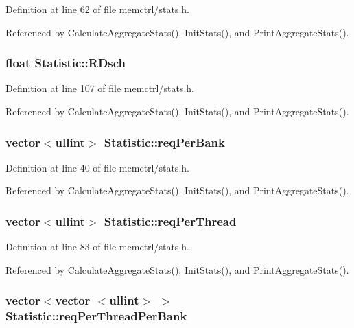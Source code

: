Definition at line 62 of file memctrl/stats.h.

Referenced by CalculateAggregateStats(), InitStats(), and PrintAggregateStats().
\subsubsection[{RDsch}]{\setlength{\rightskip}{0pt plus 5cm}float {\bf Statistic::RDsch}}\label{classStatistic_9a13d30bd7adaeb17df18ebc78536eda}




Definition at line 107 of file memctrl/stats.h.

Referenced by CalculateAggregateStats(), InitStats(), and PrintAggregateStats().
\subsubsection[{reqPerBank}]{\setlength{\rightskip}{0pt plus 5cm}vector$<${\bf ullint}$>$ {\bf Statistic::reqPerBank}}\label{classStatistic_c0e310889bcabc3c28c3947b016104c1}




Definition at line 40 of file memctrl/stats.h.

Referenced by CalculateAggregateStats(), InitStats(), and PrintAggregateStats().
\subsubsection[{reqPerThread}]{\setlength{\rightskip}{0pt plus 5cm}vector$<${\bf ullint}$>$ {\bf Statistic::reqPerThread}}\label{classStatistic_de8f6ad2747e3c7932fb23a4d658cc3e}




Definition at line 83 of file memctrl/stats.h.

Referenced by CalculateAggregateStats(), InitStats(), and PrintAggregateStats().
\subsubsection[{reqPerThreadPerBank}]{\setlength{\rightskip}{0pt plus 5cm}vector$<$vector $<${\bf ullint}$>$ $>$ {\bf Statistic::reqPerThreadPerBank}}\label{classStatistic_526960b10764074404446a35a965d11f}




